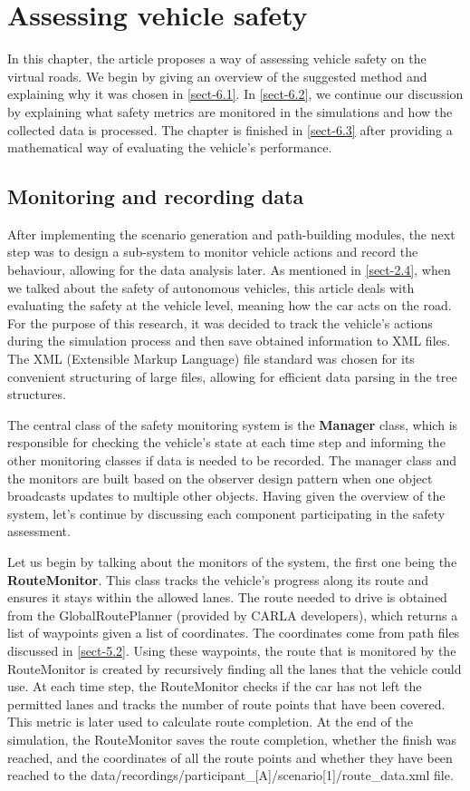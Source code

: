 \chapter{Assessing vehicle safety} \label{chap:six}
In this chapter, the article proposes a way of assessing vehicle safety on the virtual roads. We begin by giving an overview of the suggested method and explaining why it was chosen in \autoref{sect-6.1}. In \autoref{sect-6.2}, we continue our discussion by explaining what safety metrics are monitored in the simulations and how the collected data is processed. The chapter is finished in \autoref{sect-6.3} after providing a mathematical way of evaluating the vehicle's performance.

\section{Monitoring and recording data} \label{sect-6.1}
After implementing the scenario generation and path-building modules, the next step was to design a sub-system to monitor vehicle actions and record the behaviour, allowing for the data analysis later. As mentioned in \autoref{sect-2.4}, when we talked about the safety of autonomous vehicles, this article deals with evaluating the safety at the vehicle level, meaning how the car acts on the road. For the purpose of this research, it was decided to track the vehicle's actions during the simulation process and then save obtained information to XML files. The XML (Extensible Markup Language) file standard was chosen for its convenient structuring of large files, allowing for efficient data parsing in the tree structures.

The central class of the safety monitoring system is the \textbf{Manager} class, which is responsible for checking the vehicle's state at each time step and informing the other monitoring classes if data is needed to be recorded. The manager class and the monitors are built based on the observer design pattern when one object broadcasts updates to multiple other objects. Having given the overview of the system, let's continue by discussing each component participating in the safety assessment.

Let us begin by talking about the monitors of the system, the first one being the \textbf{RouteMonitor}. This class tracks the vehicle's progress along its route and ensures it stays within the allowed lanes. The route needed to drive is obtained from the GlobalRoutePlanner (provided by CARLA developers), which returns a list of waypoints given a list of coordinates. The coordinates come from path files discussed in \autoref{sect-5.2}. Using these waypoints, the route that is monitored by the RouteMonitor is created by recursively finding all the lanes that the vehicle could use. At each time step, the RouteMonitor checks if the car has not left the permitted lanes and tracks the number of route points that have been covered. This metric is later used to calculate route completion. At the end of the simulation, the RouteMonitor saves the route completion, whether the finish was reached, and the coordinates of all the route points and whether they have been reached to the data/recordings/participant\_[A]/scenario[1]/route\_data.xml file.

